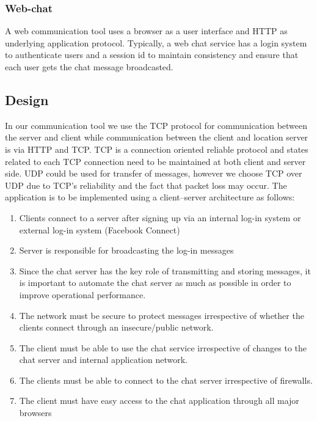 \documentclass[12pt]{article}
\begin{document}
\subsubsection{Web-chat} 
A web communication tool uses a browser as a user interface and HTTP as underlying 
application protocol. Typically, a web chat service has a login system to 
authenticate users and a session id to maintain consistency and ensure that each 
user gets the chat message broadcasted.  

\subsection{Design} 
In our communication tool we use the TCP protocol for communication between the server 
and client while communication between the client and location server is via HTTP and TCP. 
TCP is a connection oriented reliable protocol and states related to each TCP 
connection need to be maintained at both client and server side. UDP could be used 
for transfer of messages, however we choose TCP over UDP due to TCP's reliability and the fact
that packet loss may occur.  The application is to be implemented using a
client–server architecture as follows: 

\begin{enumerate} 
\item Clients connect to a server after signing up via an internal log-in system or external log-in
system (Facebook Connect) 
\item Server is responsible for broadcasting the log-in messages 
\item Since the chat server has the key role of transmitting and storing messages, it is 
important to automate the chat server as much as possible in order to improve operational performance.  
\item The network must be secure to protect messages irrespective of whether the clients connect through
an insecure/public network.  
\item The client must be able to use the chat service irrespective of changes to the chat server and internal application
network.  
\item The clients must be able to connect to the chat server irrespective of firewalls.  
\item The client must have easy access to the chat
application through all major browsers 
\end{enumerate} 
\end{document}
